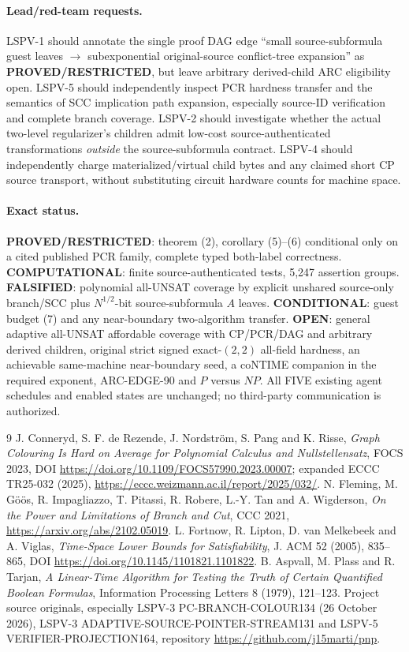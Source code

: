 \documentclass[11pt]{article}
\begin{document}
\paragraph{Lead/red-team requests.} LSPV-1 should annotate the single proof DAG edge ``small source-subformula guest leaves $\to$ subexponential original-source conflict-tree expansion'' as \textbf{PROVED/RESTRICTED}, but leave arbitrary derived-child ARC eligibility open. LSPV-5 should independently inspect PCR hardness transfer and the semantics of SCC implication path expansion, especially source-ID verification and complete branch coverage. LSPV-2 should investigate whether the actual two-level regularizer's children admit low-cost source-authenticated transformations \emph{outside} the source-subformula contract. LSPV-4 should independently charge materialized/virtual child bytes and any claimed short CP source transport, without substituting circuit hardware counts for machine space.

\paragraph{Exact status.} \textbf{PROVED/RESTRICTED}: theorem (2), corollary (5)--(6) conditional only on a cited published PCR family, complete typed both-label correctness. \textbf{COMPUTATIONAL}: finite source-authenticated tests, 5,247 assertion groups. \textbf{FALSIFIED}: polynomial all-UNSAT coverage by explicit unshared source-only branch/SCC plus $N^{1/2}$-bit source-subformula $A$ leaves. \textbf{CONDITIONAL}: guest budget (7) and any near-boundary two-algorithm transfer. \textbf{OPEN}: general adaptive all-UNSAT affordable coverage with CP/PCR/DAG and arbitrary derived children, original strict signed exact-$(2,2)$ all-field hardness, an achievable same-machine near-boundary seed, a coNTIME companion in the required exponent, ARC-EDGE-90 and $P$ versus $NP$. All FIVE existing agent schedules and enabled states are unchanged; no third-party communication is authorized.

\begin{thebibliography}{9}
 J. Conneryd, S. F. de Rezende, J. Nordstr\"om, S. Pang and K. Risse, \emph{Graph Colouring Is Hard on Average for Polynomial Calculus and Nullstellensatz}, FOCS 2023, DOI \url{https://doi.org/10.1109/FOCS57990.2023.00007}; expanded ECCC TR25-032 (2025), \url{https://eccc.weizmann.ac.il/report/2025/032/}.
 N. Fleming, M. G\"o\"os, R. Impagliazzo, T. Pitassi, R. Robere, L.-Y. Tan and A. Wigderson, \emph{On the Power and Limitations of Branch and Cut}, CCC 2021, \url{https://arxiv.org/abs/2102.05019}.
 L. Fortnow, R. Lipton, D. van Melkebeek and A. Viglas, \emph{Time-Space Lower Bounds for Satisfiability}, J. ACM 52 (2005), 835--865, DOI \url{https://doi.org/10.1145/1101821.1101822}.
 B. Aspvall, M. Plass and R. Tarjan, \emph{A Linear-Time Algorithm for Testing the Truth of Certain Quantified Boolean Formulas}, Information Processing Letters 8 (1979), 121--123.
 Project source originals, especially LSPV-3 PC-BRANCH-COLOUR134 (26 October 2026), LSPV-3 ADAPTIVE-SOURCE-POINTER-STREAM131 and LSPV-5 VERIFIER-PROJECTION164, repository \url{https://github.com/j15marti/pnp}.
\end{thebibliography}
\end{document}
